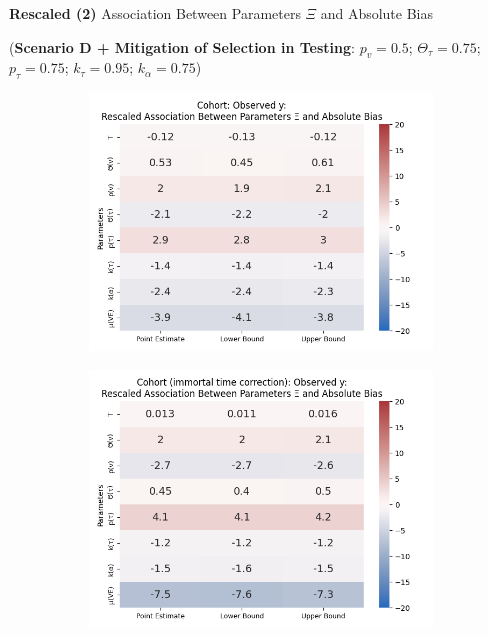 \documentclass[aspectratio=169]{beamer}
\begin{document}
\begin{frame}{\textbf{Rescaled (2)} Association Between Parameters $\Xi$ and Absolute Bias}
	\begin{center}
		\scriptsize
		(\textbf{Scenario D + Mitigation of Selection in Testing}: $p_v=0.5$; $\Theta_{\tau}=0.75$; $p_\tau=0.75$; $k_\tau=0.95$; $k_\alpha=0.75$)
	\end{center}
	\begin{figure}[H]
		\centering		
		\begin{subfigure}[t]{0.23\linewidth}
			\centering
			\includegraphics[scale=0.25]{VEMethod_Drivers1b_FEest_Realistic2_Li_MSpec_Heatmap5.png}
		\end{subfigure}
		\begin{subfigure}[t]{0.23\linewidth}
			\centering
			\includegraphics[scale=0.25]{VEMethod_Drivers1b_FEest_Realistic2_Li_MSpec_Heatmap6.png}

\end{subfigure}
\end{figure}
\end{frame}
\end{document}

